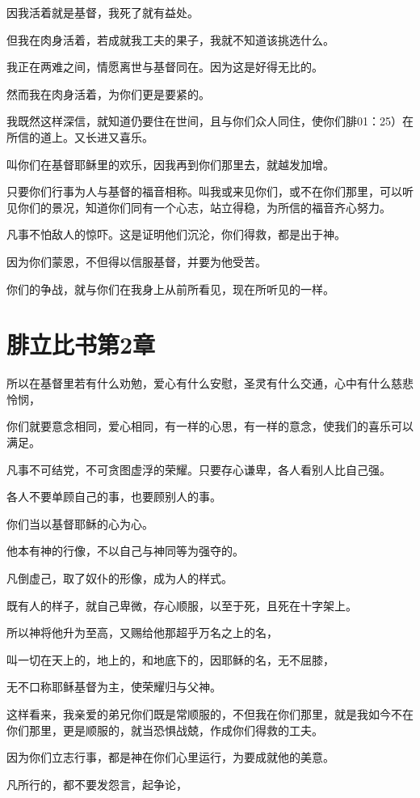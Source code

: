 \documentclass[12pt,oneside]{book}
\begin{document}
因我活着就是基督，我死了就有益处。

但我在肉身活着，若成就我工夫的果子，我就不知道该挑选什么。

我正在两难之间，情愿离世与基督同在。因为这是好得无比的。

然而我在肉身活着，为你们更是要紧的。

我既然这样深信，就知道仍要住在世间，且与你们众人同住，使你们腓01：25）在所信的道上。又长进又喜乐。

叫你们在基督耶稣里的欢乐，因我再到你们那里去，就越发加增。

只要你们行事为人与基督的福音相称。叫我或来见你们，或不在你们那里，可以听见你们的景况，知道你们同有一个心志，站立得稳，为所信的福音齐心努力。

凡事不怕敌人的惊吓。这是证明他们沉沦，你们得救，都是出于神。

因为你们蒙恩，不但得以信服基督，并要为他受苦。

你们的争战，就与你们在我身上从前所看见，现在所听见的一样。

\chapter{腓立比书第2章}
所以在基督里若有什么劝勉，爱心有什么安慰，圣灵有什么交通，心中有什么慈悲怜悯，

你们就要意念相同，爱心相同，有一样的心思，有一样的意念，使我们的喜乐可以满足。

凡事不可结党，不可贪图虚浮的荣耀。只要存心谦卑，各人看别人比自己强。

各人不要单顾自己的事，也要顾别人的事。

你们当以基督耶稣的心为心。

他本有神的行像，不以自己与神同等为强夺的。

凡倒虚己，取了奴仆的形像，成为人的样式。

既有人的样子，就自己卑微，存心顺服，以至于死，且死在十字架上。

所以神将他升为至高，又赐给他那超乎万名之上的名，

叫一切在天上的，地上的，和地底下的，因耶稣的名，无不屈膝，

无不口称耶稣基督为主，使荣耀归与父神。

这样看来，我亲爱的弟兄你们既是常顺服的，不但我在你们那里，就是我如今不在你们那里，更是顺服的，就当恐惧战兢，作成你们得救的工夫。

因为你们立志行事，都是神在你们心里运行，为要成就他的美意。

凡所行的，都不要发怨言，起争论，
\end{document}
